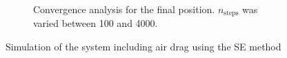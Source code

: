 \begin{figure}[h]
\begin{subfigure}{0.45\linewidth}
\begin{subfigure}{\linewidth}
        \end{subfigure}
        \caption{Convergence analysis for the final position. $n_\textrm{steps}$ was varied between 100 and 4000.}
        \label{fig:gravfrict:conv}
    \end{subfigure}
    \caption{Simulation of the system including air drag using the SE method}
\end{figure}

